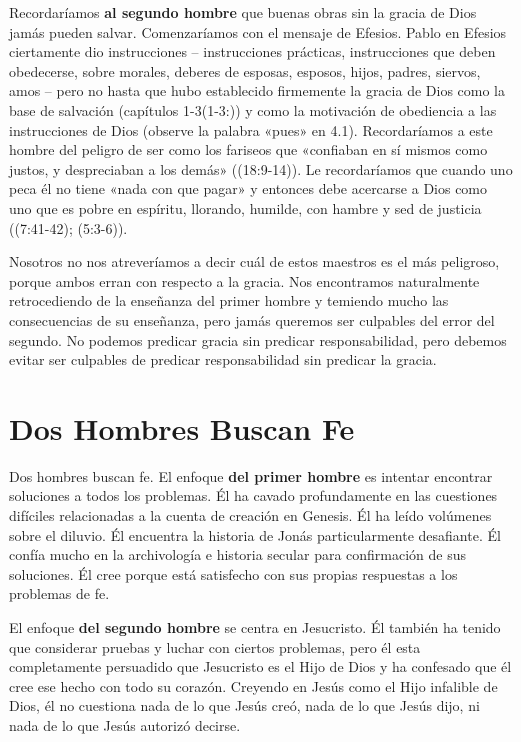 \documentclass[12pt, twoside, openright]{book}
\begin{document}
Recordaríamos \textbf{al segundo hombre} que buenas obras sin la gracia de Dios jamás pueden salvar. Comenzaríamos con el mensaje de Efesios. Pablo en Efesios ciertamente dio instrucciones – instrucciones prácticas, instrucciones que deben obedecerse, sobre morales, deberes de esposas, esposos, hijos, padres, siervos, amos – pero no hasta que hubo establecido firmemente la gracia de Dios como la base de salvación (capítulos 1-3(1-3:)) y como la motivación de obediencia a las instrucciones de Dios (observe la palabra «pues» en 4.1). Recordaríamos a este hombre del peligro de ser como los fariseos que «confiaban en sí mismos como justos, y despreciaban a los demás» ((18:9-14)). Le recordaríamos que cuando uno peca él no tiene «nada con que pagar» y entonces debe acercarse a Dios como uno que es pobre en espíritu, llorando, humilde, con hambre y sed de justicia ((7:41-42); (5:3-6)). 

Nosotros no nos atreveríamos a decir cuál de estos maestros es el más peligroso, porque ambos erran con respecto a la gracia. Nos encontramos naturalmente retrocediendo de la enseñanza del primer hombre y temiendo mucho las consecuencias de su enseñanza, pero jamás queremos ser culpables del error del segundo. No podemos predicar gracia sin predicar responsabilidad, pero debemos evitar ser culpables de predicar responsabilidad sin predicar la gracia. 

\section{Dos Hombres Buscan Fe}
Dos hombres buscan fe. El enfoque \textbf{del primer hombre} es intentar encontrar soluciones a todos los problemas. Él ha cavado profundamente en las cuestiones difíciles relacionadas a la cuenta de creación en Genesis. Él ha leído volúmenes sobre el diluvio. Él encuentra la historia de Jonás particularmente desafiante. Él confía mucho en la archivología e historia secular para confirmación de sus soluciones. Él cree porque está satisfecho con sus propias respuestas a los problemas de fe. 

El enfoque \textbf{del segundo hombre} se centra en Jesucristo. Él también ha tenido que considerar pruebas y luchar con ciertos problemas, pero él esta completamente persuadido que Jesucristo es el Hijo de Dios y ha confesado que él cree ese hecho con todo su corazón. Creyendo en Jesús como el Hijo infalible de Dios, él no cuestiona nada de lo que Jesús creó, nada de lo que Jesús dijo, ni nada de lo que Jesús autorizó decirse. 
\end{document}
